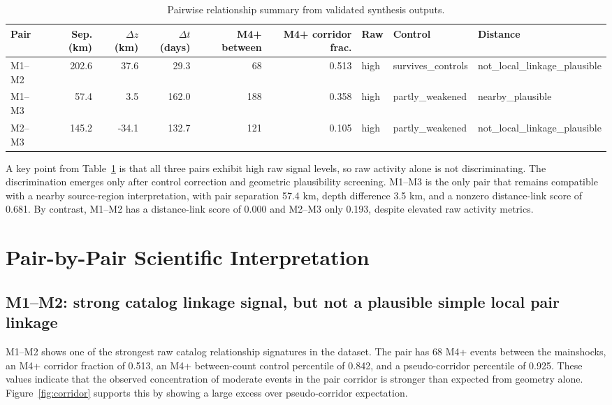 \documentclass[11pt]{article}
\begin{document}
\begin{table}[H]
\centering
\caption{Pairwise relationship summary from validated synthesis outputs.}
\label{tab:pairwise}
\begin{tabularx}{\textwidth}{>{\RaggedRight\arraybackslash}p{1.8cm}rrrrr>{\RaggedRight\arraybackslash}p{1.9cm}>{\RaggedRight\arraybackslash}p{2.7cm}>{\RaggedRight\arraybackslash}p{3.6cm}}
\toprule
Pair & Sep. (km) & $\Delta z$ (km) & $\Delta t$ (days) & M4+ between & M4+ corridor frac. & Raw & Control & Distance \\
\midrule
M1--M2 & 202.6 & 37.6 & 29.3 & 68 & 0.513 & high & survives\_controls & not\_local\_linkage\_plausible \\
M1--M3 & 57.4 & 3.5 & 162.0 & 188 & 0.358 & high & partly\_weakened & nearby\_plausible \\
M2--M3 & 145.2 & -34.1 & 132.7 & 121 & 0.105 & high & partly\_weakened & not\_local\_linkage\_plausible \\
\bottomrule
\end{tabularx}
\end{table}

A key point from Table~\ref{tab:pairwise} is that all three pairs exhibit high raw signal levels, so raw activity alone is not discriminating. The discrimination emerges only after control correction and geometric plausibility screening. M1--M3 is the only pair that remains compatible with a nearby source-region interpretation, with pair separation 57.4 km, depth difference 3.5 km, and a nonzero distance-link score of 0.681. By contrast, M1--M2 has a distance-link score of 0.000 and M2--M3 only 0.193, despite elevated raw activity metrics.

\section{Pair-by-Pair Scientific Interpretation}
\subsection{M1--M2: strong catalog linkage signal, but not a plausible simple local pair linkage}
M1--M2 shows one of the strongest raw catalog relationship signatures in the dataset. The pair has 68 M4+ events between the mainshocks, an M4+ corridor fraction of 0.513, an M4+ between-count control percentile of 0.842, and a pseudo-corridor percentile of 0.925. These values indicate that the observed concentration of moderate events in the pair corridor is stronger than expected from geometry alone. Figure~\ref{fig:corridor} supports this by showing a large excess over pseudo-corridor expectation.
\end{document}
